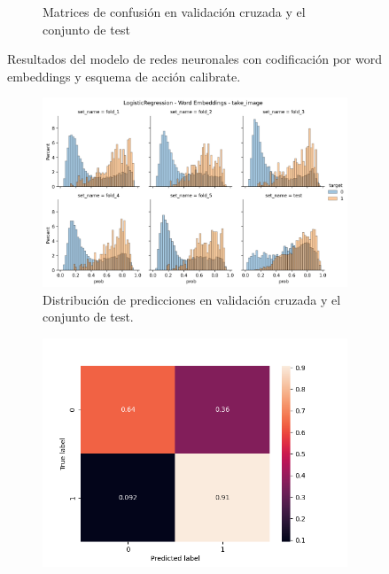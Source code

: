 \begin{figure}
\begin{subfigure}[b]{\textwidth}
    \endminipage
    \caption{Matrices de confusión en validación cruzada y el conjunto de test}
    \end{subfigure}
    \caption{Resultados del modelo de redes neuronales con codificación por word embeddings y esquema de acción calibrate.}
\end{figure}


\begin{figure}
    \begin{subfigure}[b]{\textwidth}
        \centering
        \includegraphics[width=\linewidth]{figures/results/word_embeddings/lgr/take_image/lgr__distplot.png}
        \caption{Distribución de predicciones en validación cruzada y el conjunto de test.}
        \label{fig:my_label}
    \end{subfigure}
    \hfill
    \begin{subfigure}[b]{\textwidth}
      \includegraphics[width=\linewidth]{figures/results/word_embeddings/lgr/take_image/lgr_set_1_confusion_matrix_percent.png}

\end{subfigure}
\end{figure}

